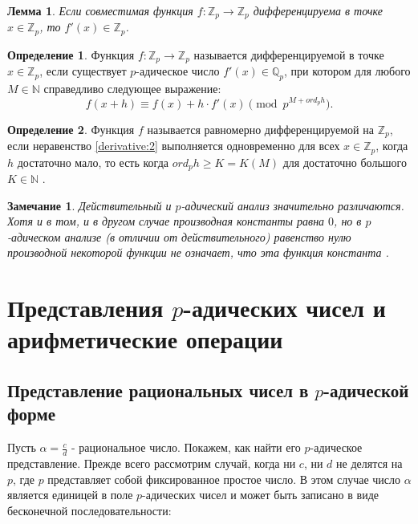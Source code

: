 \documentclass[master, och, diploma, times]{sty/SCWorks}
\theoremstyle{plain}
\newtheorem{lemma}{Лемма}[section]
\newtheorem{note}{Замечание}[section]
\theoremstyle{definition}
\newtheorem{defn}{Определение}[section]
\numberwithin{equation}{section}
\begin{document}
\begin{lemma}
Если совместимая функция $f:\mathbb {Z}_p \rightarrow \mathbb {Z}_p$ дифференцируема в точке $x \in \mathbb {Z}_p$, то $f'(x) \in \mathbb {Z}_p$.
\end{lemma}

\begin{defn}
Функция $f:\mathbb {Z}_p \rightarrow \mathbb {Z}_p$ называется дифференцируемой в точке $x \in \mathbb {Z}_p$, если существует $p$-адическое число $f'(x) \in \mathbb {Q}_p$, при котором для любого $M \in \mathbb {N}$ справедливо следующее выражение:
\begin{equation} \label{derivative:2}
	f(x+h) \equiv f(x) + h \cdot f'(x) \pmod p^{M + ord_p h}.
\end{equation}
\end{defn}

\begin{defn}
Функция $f$ называется равномерно дифференцируемой на $\mathbb {Z}_p$, если неравенство \eqref{derivative:2} выполняется одновременно для всех $x \in \mathbb {Z}_p$, когда $h$ достаточно мало, то есть когда $ord_p h \ge K=K(M)$ для достаточно большого $K \in \mathbb {N}$ \cite{bib:analisys:vv}.
\end{defn}

\begin{note}
Действительный и $p$-адический анализ значительно различаются. Хотя и в том, и в другом случае производная константы равна $0$, но в $p$-адическом анализе (в отличии от действительного) равенство нулю производной некоторой функции не означает, что эта функция константа \cite{bib:analysis:alain}.
\end{note}

\section{Представления $p$-адических чисел и арифметические операции}

\subsection{Представление рациональных чисел в $p$-адической форме}

Пусть $\alpha=\frac{c}{d}$ - рациональное число. Покажем, как найти его $p$-адическое представление. Прежде всего рассмотрим случай, когда ни $c$, ни $d$ не делятся на $p$, где $p$ представляет собой фиксированное простое число. В этом случае число $\alpha$ является единицей в поле $p$-адических чисел и может быть записано в виде бесконечной последовательности: 
\end{document}
